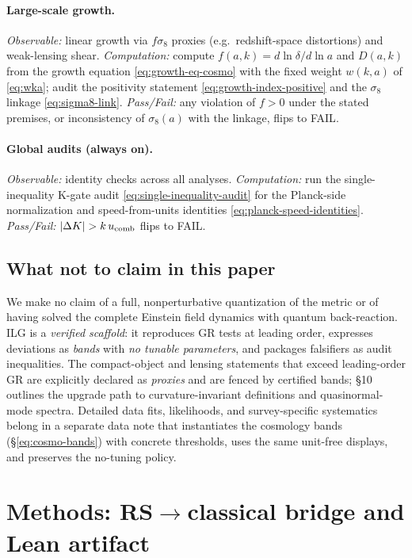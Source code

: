 \documentclass[12pt,a4paper]{article}
\begin{document}
\paragraph{Large-scale growth.}
\emph{Observable:} linear growth via \(f\sigma_8\) proxies (e.g.\ redshift-space distortions) and weak-lensing shear. 
\emph{Computation:} compute \(f(a,k)=d\ln\delta/d\ln a\) and \(D(a,k)\) from the growth equation \eqref{eq:growth-eq-cosmo} with the fixed weight \(w(k,a)\) of \eqref{eq:wka}; audit the positivity statement \eqref{eq:growth-index-positive} and the \(\sigma_8\) linkage \eqref{eq:sigma8-link}. 
\emph{Pass/Fail:} any violation of \(f>0\) under the stated premises, or inconsistency of \(\sigma_8(a)\) with the linkage, flips to \textsc{FAIL}.

\paragraph{Global audits (always on).}
\emph{Observable:} identity checks across all analyses. 
\emph{Computation:} run the single-inequality K-gate audit \eqref{eq:single-inequality-audit} for the Planck-side normalization and speed-from-units identities \eqref{eq:planck-speed-identities}.
\emph{Pass/Fail:} \(|\Delta K|>k\,u_{\rm comb}\) flips to \textsc{FAIL}.

\subsection{What not to claim in this paper}
We make no claim of a full, nonperturbative quantization of the metric or of having solved the complete Einstein field dynamics with quantum back-reaction. ILG is a \emph{verified scaffold}: it reproduces GR tests at leading order, expresses deviations as \emph{bands} with \emph{no tunable parameters}, and packages falsifiers as audit inequalities. The compact-object and lensing statements that exceed leading-order GR are explicitly declared as \emph{proxies} and are fenced by certified bands; §10 outlines the upgrade path to curvature-invariant definitions and quasinormal-mode spectra. Detailed data fits, likelihoods, and survey-specific systematics belong in a separate data note that instantiates the cosmology bands (\S\ref{eq:cosmo-bands}) with concrete thresholds, uses the same unit-free displays, and preserves the no-tuning policy.

\section{Methods: RS$\to$classical bridge and Lean artifact}
\end{document}
